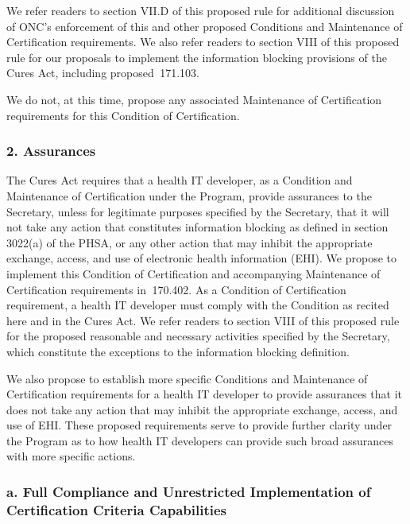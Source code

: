 \documentclass[twoside,11pt]{article}
\begin{document}
          We refer readers to section VII.D of this proposed rule for additional discussion of ONC's enforcement of this and other proposed Conditions and Maintenance of Certification requirements. We also refer readers to section VIII of this proposed rule for our proposals to implement the information blocking provisions of the Cures Act, including proposed \textsection{} 171.103.


          We do not, at this time, propose any associated Maintenance of Certification requirements for this Condition of Certification.


          \subsubsection{2. Assurances}

          The Cures Act requires that a health IT developer, as a Condition and Maintenance of Certification under the Program, provide assurances to the Secretary, unless for legitimate purposes specified by the Secretary, that it will not take any action that constitutes information blocking as defined in section 3022(a) of the PHSA, or any other action that may inhibit the appropriate exchange, access, and use of electronic health information (EHI). We propose to implement this Condition of Certification and accompanying Maintenance of Certification requirements in \textsection{} 170.402. As a Condition of Certification requirement, a health IT developer must comply with the Condition as recited here and in the Cures Act. We refer readers to section VIII of this proposed rule for the proposed reasonable and necessary activities specified by the Secretary, which constitute the exceptions to the information blocking definition.


          We also propose to establish more specific Conditions and Maintenance of Certification requirements for a health IT developer to provide assurances that it does not take any action that may inhibit the appropriate exchange, access, and use of EHI. These proposed requirements serve to provide further clarity under the Program as to how health IT developers can provide such broad assurances with more specific actions.


          \subsubsection{a. Full Compliance and Unrestricted Implementation of Certification Criteria Capabilities}
\end{document}
